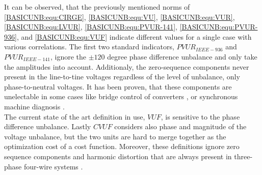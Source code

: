 			It can be observed, that the previously mentioned norms of \ref{BASICUNB:equ:CIRGE}, \ref{BASICUNB:equ:VU}, \ref{BASICUNB:equ:VUR}, \ref{BASICUNB:equ:LVUR}, \ref{BASICUNB:equ:PVUR-141}, \ref{BASICUNB:equ:PVUR-936}, and \ref{BASICUNB:equ:VUF}  indicate different values for a single case with various correlations. The first two standard indicators, $PVUR_{IEEE-936}$ and $PVUR_{IEEE-141}$, ignore the $\pm120$ degree phase difference unbalance and only take the amplitudes into account. Additionaly, the zero-sequence components never present in the line-to-tine voltages regardless of the level of unbalance, only phase-to-neutral voltages. It has been proven, that these components are unelectable in some cases like bridge control of converters \cite{betz2006symmetry}, or synchronous machine diagnosis \cite{hang2015online}.\\ 
			The current state of the art definition in use, $VUF$, is sensitive to the phase difference unbalance. Lastly $CVUF$ considers also phase and magnitude of the voltage unbalance, but the two units are hard to merge together as the optimization cost of a cost function. Moreover, these definitions ignore zero sequence components and harmonic distortion that are always present in three-phase four-wire systems \cite{bina2011three}.
		          


	

